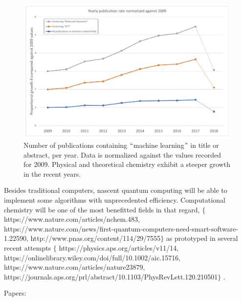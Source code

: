 \begin{figure}[H]
	\includegraphics[width=\textwidth]{./figures/01/publication-trends-ml_crop.pdf}
	\caption[Machine learning publication trends]{Number of publications containing $``$machine learning$"$  in title or abstract, per year. Data is normalized against the values recorded for 2009. Physical and theoretical chemistry exhibit a steeper growth in the recent years.}
	\label{fig:machinelearningtrends}
\end{figure}


Besides traditional computers, nascent quantum computing will be able to implement some algorithms with unprecedented efficiency. Computational chemistry will be one of the most benefitted fields in that regard, $ \{ $ https://www.nature.com/articles/nchem.483, https://www.nature.com/news/first-quantum-computers-need-smart-software-1.22590, http://www.pnas.org/content/114/29/7555$ \} $  as prototyped in several recent attempts $ \{ $ https://physics.aps.org/articles/v11/14, https://onlinelibrary.wiley.com/doi/full/10.1002/aic.15716, https://www.nature.com/articles/nature23879, https://journals.aps.org/prl/abstract/10.1103/PhysRevLett.120.210501$ \} $ .

Papers:

